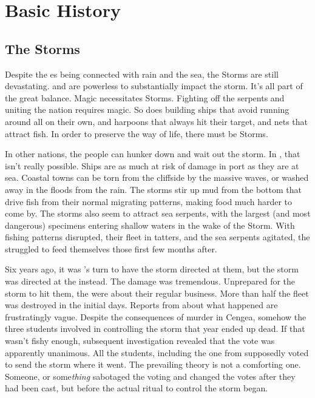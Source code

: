 \documentclass[blue]{GL2020}
\begin{document}
\name{\bVikings{}}

\section*{Basic History}


\subsection*{The Storms}
Despite the \pShip{} \cEbb{\God}es being connected with rain and the sea, the Storms are still devastating. \cEbb{} and \cFlow{} are powerless to substantially impact the storm. It's all part of the great balance. Magic necessitates Storms. Fighting off the serpents and uniting the \pShip{} nation requires magic. So does building ships that avoid running around all on their own, and harpoons that always hit their target, and nets that attract fish. In order to preserve the \pShip{} way of life, there must be Storms.

In other nations, the people can hunker down and wait out the storm. In \pShip{}, that isn't really possible. Ships are as much at risk of damage in port as they are at sea. Coastal towns can be torn from the cliffside by the massive waves, or washed away in the floods from the rain. The storms stir up mud from the bottom that drive fish from their normal migrating patterns, making food much harder to come by. The storms also seem to attract sea serpents, with the largest (and most dangerous) specimens entering shallow waters in the wake of the Storm. With fishing patterns disrupted, their fleet in tatters, and the sea serpents agitated, the \pShip{} struggled to feed themselves those first few months after.

Six years ago, it was \pTech{}'s turn to have the storm directed at them, but the storm was directed at the \pShip{} instead. The damage was tremendous. Unprepared for the storm to hit them, the \pShippies{} were about their regular business. More than half the fleet was destroyed in the initial days. Reports from \pSchool{} about what happened are frustratingly vague. Despite the consequences of murder in Cengea, somehow the three students involved in controlling the storm that year ended up dead. If that wasn't fishy enough, subsequent investigation revealed that the vote was apparently unanimous. All the students, including the one from \pShip{} supposedly voted to send the storm where it went. The prevailing theory is not a comforting one. Someone, or some\emph{thing} sabotaged the voting and changed the votes after they had been cast, but before the actual ritual to control the storm began.
\end{document}
